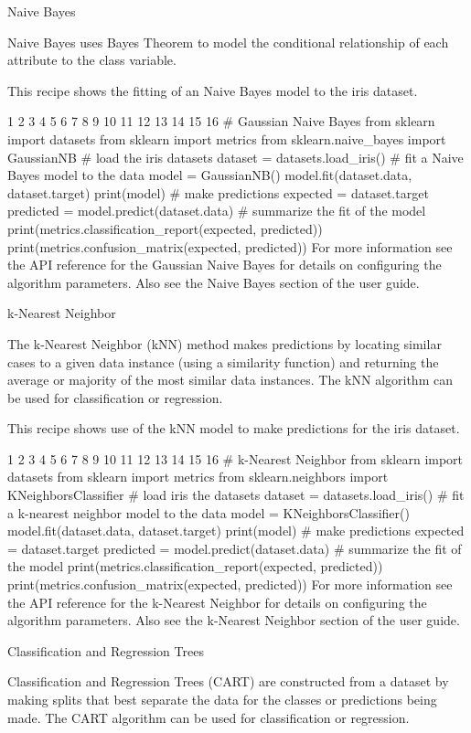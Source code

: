 \documentclass[12pt]{article}
\begin{document}
Naive Bayes

Naive Bayes uses Bayes Theorem to model the conditional relationship of each attribute to the class variable.

This recipe shows the fitting of an Naive Bayes model to the iris dataset.


1
2
3
4
5
6
7
8
9
10
11
12
13
14
15
16
# Gaussian Naive Bayes
from sklearn import datasets
from sklearn import metrics
from sklearn.naive_bayes import GaussianNB
# load the iris datasets
dataset = datasets.load_iris()
# fit a Naive Bayes model to the data
model = GaussianNB()
model.fit(dataset.data, dataset.target)
print(model)
# make predictions
expected = dataset.target
predicted = model.predict(dataset.data)
# summarize the fit of the model
print(metrics.classification_report(expected, predicted))
print(metrics.confusion_matrix(expected, predicted))
For more information see the API reference for the Gaussian Naive Bayes for details on configuring the algorithm parameters. Also see the Naive Bayes section of the user guide.

k-Nearest Neighbor

The k-Nearest Neighbor (kNN) method makes predictions by locating similar cases to a given data instance (using a similarity function) and returning the average or majority of the most similar data instances. The kNN algorithm can be used for classification or regression.

This recipe shows use of the kNN model to make predictions for the iris dataset.


1
2
3
4
5
6
7
8
9
10
11
12
13
14
15
16
# k-Nearest Neighbor
from sklearn import datasets
from sklearn import metrics
from sklearn.neighbors import KNeighborsClassifier
# load iris the datasets
dataset = datasets.load_iris()
# fit a k-nearest neighbor model to the data
model = KNeighborsClassifier()
model.fit(dataset.data, dataset.target)
print(model)
# make predictions
expected = dataset.target
predicted = model.predict(dataset.data)
# summarize the fit of the model
print(metrics.classification_report(expected, predicted))
print(metrics.confusion_matrix(expected, predicted))
For more information see the API reference for the k-Nearest Neighbor for details on configuring the algorithm parameters. Also see the k-Nearest Neighbor section of the user guide.

Classification and Regression Trees

Classification and Regression Trees (CART) are constructed from a dataset by making splits that best separate the data for the classes or predictions being made. The CART algorithm can be used for classification or regression.
\end{document}
